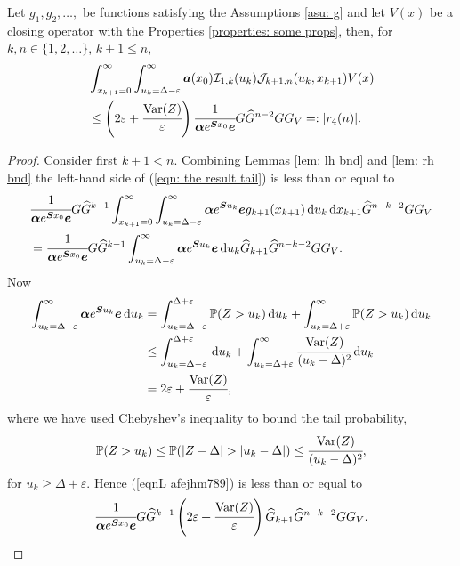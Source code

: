 \begin{cor}\label{cor: lh and rh}
	Let \(g_1, g_2, \dots,\) be functions satisfying the Assumptions \ref{asu: g} and let \(V(x)\) be a closing operator with the Properties \ref{properties: some props}, then, for \(k,n \in \{1,2,\dots\}\), \(k+1\leq n\),
	\begin{align}
		&\int_{x_{k+1}=0}^\infty \int_{u_k=\Delta-\varepsilon}^\infty \boldsymbol a (x_0)\mathcal I_{1,k}(u_k) \mathcal J_{k+1,n}(u_k,x_{k+1})V(x) \nonumber
            	\\&\leq \left(2\varepsilon + \cfrac{\mathrm{Var}(Z)}{\varepsilon}\right) \cfrac{1}{\boldsymbol \alpha e^{\boldsymbol{S}x_0}\boldsymbol e} G \widehat G^{n-2} G G_V =: |r_4(n)|. \label{eqn: the result tail}
	\end{align}
\end{cor}
\begin{proof}
	Consider first \(k+1<n\). Combining Lemmas \ref{lem: lh bnd} and \ref{lem: rh bnd} the left-hand side of (\ref{eqn: the result tail}) is less than or equal to 
	\begin{align}
		&\cfrac{1}{\boldsymbol \alpha e^{\boldsymbol{S} x_0 }\boldsymbol e}G \widehat G^{k-1}
		\int_{x_{k+1}=0}^\infty \int_{u_k=\Delta-\varepsilon}^\infty \boldsymbol \alpha e^{\boldsymbol{S}u_k}\boldsymbol e g_{k+1}(x_{k+1}) \, \mathrm{d} u_k \, \mathrm{d} x_{k+1}\widehat G^{n-k-2} G G_V \label{eqn: yet yet another label}
		\\&=\cfrac{1}{\boldsymbol \alpha e^{\boldsymbol{S} x_0}\boldsymbol e}G \widehat G^{k-1}  
		\int_{u_k=\Delta-\varepsilon}^\infty \boldsymbol \alpha e^{\boldsymbol{S}u_k}\boldsymbol e \, \mathrm{d} u_k \widehat G_{k+1} \widehat G^{n-k-2} G G_V. \label{eqnL afejhm789}
	\end{align}
	Now 
	\begin{align}
		\int_{u_k=\Delta-\varepsilon}^\infty \boldsymbol \alpha e^{\boldsymbol{S}u_k}\boldsymbol e \, \mathrm{d} u_k &= \int_{u_k=\Delta-\varepsilon}^{\Delta+\varepsilon} \mathbb P(Z> u_k) \, \mathrm{d} u_k + \int_{u_k=\Delta+\varepsilon}^\infty \mathbb P(Z> u_k) \, \mathrm{d} u_k\nonumber
		\\&\leq \int_{u_k=\Delta-\varepsilon}^{\Delta+\varepsilon} \, \mathrm{d} u_k + \int_{u_k=\Delta+\varepsilon}^\infty \cfrac{\mathrm{Var}(Z)}{(u_k-\Delta)^2} \, \mathrm{d} u_k\nonumber
		\\&= 2\varepsilon + \cfrac{\mathrm{Var}(Z)}{\varepsilon},\label{eqn:kdjf55}
	\end{align}
	where we have used Chebyshev's inequality to bound the tail probability, 
	\[\mathbb P(Z> u_k) \leq \mathbb P(|Z-\Delta|> |u_k-\Delta|) \leq \cfrac{\var(Z)}{(u_k-\Delta)^2},\]
	for \(u_k \geq \Delta +\varepsilon\). Hence (\ref{eqnL afejhm789}) is less than or equal to 
	\[\cfrac{1}{\boldsymbol \alpha e^{\boldsymbol{S} x_0}\boldsymbol e}G \widehat G^{k-1}  
		\left(2\varepsilon + \cfrac{\mathrm{Var}(Z)}{\varepsilon}\right) \widehat G_{k+1} \widehat G^{n-k-2} G G_V.\]
	

\end{proof}
